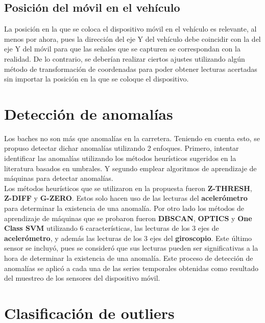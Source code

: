 	\subsection{Posición del móvil en el vehículo}
		La posición en la que se coloca el dispositivo móvil en el vehículo es relevante, al menos por ahora, pues la
		dirección del eje Y del vehículo debe coincidir con la del eje Y del móvil para que las señales que se capturen
		se correspondan con la realidad. De lo contrario, se deberían realizar ciertos ajustes utilizando algún método de
		transformación de coordenadas para poder obtener lecturas acertadas sin importar la posición en la que se coloque
		el dispositivo.

\section{Detección de anomalías}
	Los baches no son más que anomalías en la carretera. Teniendo en cuenta esto, se propuso detectar dichar anomalías utilizando
	2 enfoques. Primero, intentar identificar las anomalías utilizando los métodos heurísticos sugeridos en la literatura basados
	en umbrales. Y segundo emplear algoritmos de aprendizaje de máquinas para detectar anomalías.\\
	\indent Los métodos heurísticos que se utilizaron en la propuesta fueron \textbf{Z-THRESH}, \textbf{Z-DIFF} y \textbf{G-ZERO}.
	Estos solo hacen uso de las lecturas del \textbf{acelerómetro} para determinar la existencia de una anomalía. Por otro lado los
	métodos de aprendizaje de máquinas que se probaron fueron \textbf{DBSCAN}, \textbf{OPTICS} y \textbf{One Class SVM} utilizando 
	6 características, las lecturas de los 3 ejes de \textbf{acelerómetro}, y además las lecturas de los 3 ejes del \textbf{giroscopio}.
	Este último sensor se incluyó, pues se consideró que sus lecturas pueden ser significativas a la hora de determinar la existencia de una 
	anomalía. Este proceso de detección de anomalías se aplicó a cada una de las series temporales obtenidas como resultado del muestreo
	de los sensores del dispositivo móvil.


\section{Clasificación de outliers}


